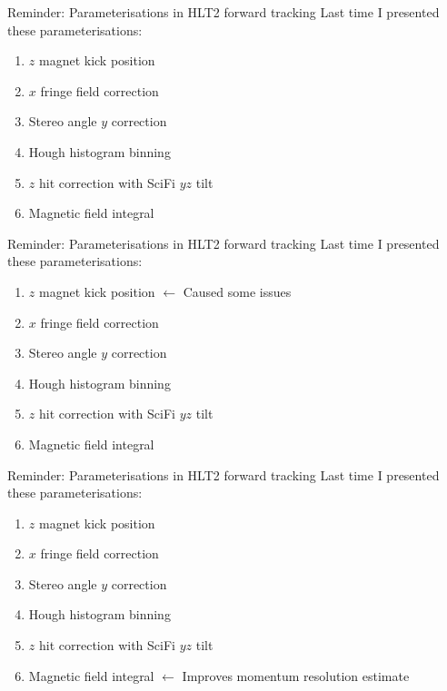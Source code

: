 \documentclass[xcolor={dvipsnames}]{beamer}
\begin{document}
\begin{frame}{Reminder: Parameterisations in HLT2 forward tracking}
  \vspace{0.0cm}
  {\large Last time I presented these parameterisations:}
  \vspace{0.2cm}
  \begin{enumerate}
    \setlength\itemsep{0.5em}
    \item{$z$ magnet kick position}
    \item{$x$ fringe field correction}
    \item{Stereo angle $y$ correction}
    \item{Hough histogram binning}
    \item{$z$ hit correction with SciFi $yz$ tilt}
    \item{Magnetic field integral}
  \end{enumerate}
\end{frame}

\begin{frame}{Reminder: Parameterisations in HLT2 forward tracking}
  \vspace{0.0cm}
  {\large Last time I presented these parameterisations:}
  \vspace{0.2cm}
  \begin{enumerate}
    \setlength\itemsep{0.5em}
    \item{$z$ magnet kick position $\leftarrow$ Caused some issues}
    \item{$x$ fringe field correction}
    \item{Stereo angle $y$ correction}
    \item{Hough histogram binning}
    \item{$z$ hit correction with SciFi $yz$ tilt}
    \item{Magnetic field integral}
  \end{enumerate}
\end{frame}

\begin{frame}{Reminder: Parameterisations in HLT2 forward tracking}
  \vspace{0.0cm}
  {\large Last time I presented these parameterisations:}
  \vspace{0.2cm}
  \begin{enumerate}
    \setlength\itemsep{0.5em}
    \item{$z$ magnet kick position}
    \item{$x$ fringe field correction}
    \item{Stereo angle $y$ correction}
    \item{Hough histogram binning}
    \item{$z$ hit correction with SciFi $yz$ tilt}
    \item{Magnetic field integral $\leftarrow$ Improves momentum resolution estimate}
  \end{enumerate}
\end{frame}
\end{document}

